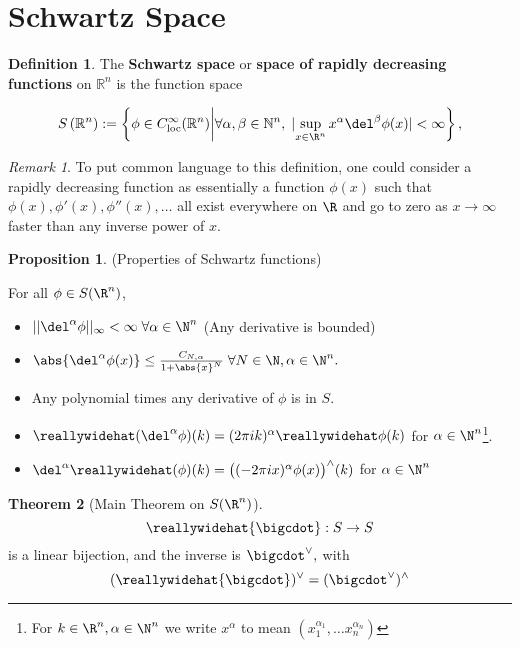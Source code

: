 \documentclass[a5paper]{article}
\theoremstyle{definition}%
\newtheorem{theorem}{Theorem}
\newtheorem{proposition}[theorem]{Proposition}
\newtheorem*{definition*}{Definition}
\numberwithin{exercise}{section}
\theoremstyle{remark}%
\newtheorem*{remark*}{Remark}
\begin{document}
\section*{Schwartz Space}


\begin{highlight}
\begin{definition*}
The \textbf{Schwartz space} or \textbf{space of rapidly decreasing functions} on ${\displaystyle \mathbb {R} ^{n}}$ is the function space

$${\displaystyle S\left(\mathbb {R} ^{n}\right):=\left\{\phi\in C_{\text{loc}}^{\infty }(\mathbb {R} ^{n})\middle| \forall \alpha ,\beta \in \mathbb {N} ^{n}, \;|\!\sup_{x\in \Rn}x^\alpha\del^\beta \phi(x)|<\infty \right\},}$$
\end{definition*}
\end{highlight}
\begin{remark*}
To put common language to this definition, one could consider a rapidly decreasing function as essentially a function $\phi(x)$ such that $\phi(x), \phi'(x), \phi''(x), \ldots$ all exist everywhere on $\R$ and go to zero as $x \to \infty$ faster than any inverse power of $x$.
\end{remark*}

\begin{highlight}
\begin{proposition}
(Properties of Schwartz functions) 

For all $\phi\in S(\Rn)$,
\begin{itemize}
\item $\norm{\del^\alpha \phi}_\infty<\infty \; \forall \alpha\in\N^n$ (Any derivative is bounded)
\item $\abs{\del^\alpha \phi(x)}\leq \frac{C_{N,\alpha}}{1+\abs{x}^N} \; \forall N\in \N, \alpha\in \N^n.$
\item Any polynomial times any derivative of $\phi$ is in $S$.
\item $\hat{(\del^\alpha\phi)}(k)=(2\pi i k)^\alpha \hat{\phi}(k)$ for $\alpha\in\N^n$\footnote{For $k\in\R^n, \alpha\in\N^n$ we write $x^\alpha$ to mean $(x_1^{\alpha_1}, \dots x_n^{\alpha_n})$}.
\item $\del^\alpha\hat{(\phi)}(k)=\big((-2\pi i x)^\alpha {\phi}(x)\big)^\wedge(k)$ for $\alpha\in\N^n$
\end{itemize}
\end{proposition}
\end{highlight}

\renewcommand{\hat}{\reallywidehat}
\begin{highlight}
\begin{theorem}[Main Theorem on $S(\R^n)$]

$$\hat{\bigcdot}:S\to S$$ 
is a linear bijection, and the inverse is $\bigcdot^\vee,$ 
with 
$$(\hat{\bigcdot})^\vee=(\bigcdot^\vee)^\wedge$$
\end{theorem}
\end{highlight}
\end{document}
